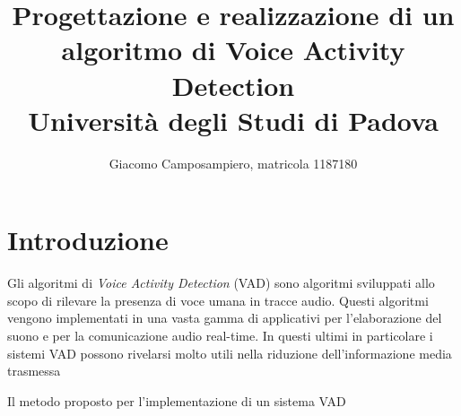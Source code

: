\documentclass[10pt,twocolumn,a4]{article}
\title{\textbf{Progettazione e realizzazione di un algoritmo di Voice Activity Detection} \\ \vspace{0.5cm} {\large Università degli Studi di Padova}}
\author{Giacomo Camposampiero, matricola 1187180}
\begin{document}
\maketitle

\section{Introduzione}
Gli algoritmi di \textit{Voice Activity Detection} (VAD) sono algoritmi sviluppati allo scopo di rilevare la
presenza di voce umana in tracce audio. Questi algoritmi vengono implementati in una vasta gamma di applicativi
per l'elaborazione del suono e per la comunicazione audio real-time. In questi ultimi in particolare i sistemi
VAD possono rivelarsi molto utili nella riduzione dell'informazione media trasmessa 

Il metodo proposto per l'implementazione di un sistema VAD 





\end{document}
